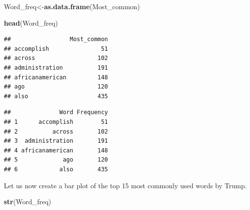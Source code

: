\documentclass[]{article}
\newenvironment{Shaded}{\begin{snugshade}}{\end{snugshade}}
\newcommand{\KeywordTok}[1]{\textcolor[rgb]{0.13,0.29,0.53}{\textbf{#1}}}
\newcommand{\DecValTok}[1]{\textcolor[rgb]{0.00,0.00,0.81}{#1}}
\newcommand{\StringTok}[1]{\textcolor[rgb]{0.31,0.60,0.02}{#1}}
\newcommand{\OperatorTok}[1]{\textcolor[rgb]{0.81,0.36,0.00}{\textbf{#1}}}
\newcommand{\NormalTok}[1]{#1}
\begin{document}
\begin{Shaded}
\begin{Highlighting}[]
\NormalTok{Word_freq<-}\KeywordTok{as.data.frame}\NormalTok{(Most_common)}

\KeywordTok{head}\NormalTok{(Word_freq)}
\end{Highlighting}
\end{Shaded}

\begin{verbatim}
##                 Most_common
## accomplish               51
## across                  102
## administration          191
## africanamerican         148
## ago                     120
## also                    435
\end{verbatim}

\begin{Shaded}
\end{Shaded}

\begin{verbatim}
##              Word Frequency
## 1      accomplish        51
## 2          across       102
## 3  administration       191
## 4 africanamerican       148
## 5             ago       120
## 6            also       435
\end{verbatim}

\begin{Shaded}
\end{Shaded}

Let us now create a bar plot of the top 15 most commonly used words by
Trump.

\begin{Shaded}
\begin{Highlighting}[]
\KeywordTok{str}\NormalTok{(Word_freq)}
\end{Highlighting}
\end{Shaded}
\end{document}
